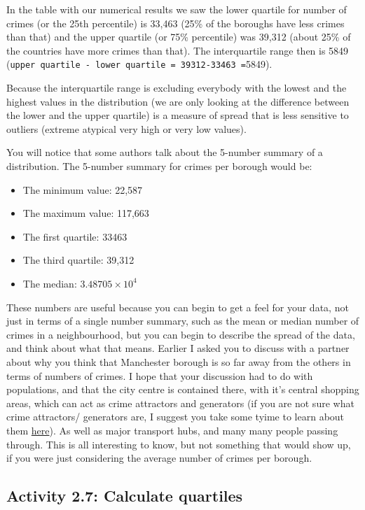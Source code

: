 \documentclass[
]{book}
\providecommand{\tightlist}{%
  \setlength{\itemsep}{0pt}\setlength{\parskip}{0pt}}
\begin{document}
In the table with our numerical results we saw the lower quartile for number of crimes (or the 25th percentile) is 33,463 (25\% of the boroughs have less crimes than that) and the upper quartile (or 75\% percentile) was 39,312 (about 25\% of the countries have more crimes than that). The interquartile range then is 5849 (\texttt{upper\ quartile\ -\ lower\ quartile\ =\ 39312-33463\ =}5849).

Because the interquartile range is excluding everybody with the lowest and the highest values in the distribution (we are only looking at the difference between the lower and the upper quartile) is a measure of spread that is less sensitive to outliers (extreme atypical very high or very low values).

You will notice that some authors talk about the 5-number summary of a distribution. The 5-number summary for crimes per borough would be:

\begin{itemize}
\tightlist
\item
  The minimum value: 22,587
\item
  The maximum value: 117,663
\item
  The first quartile: 33463
\item
  The third quartile: 39,312
\item
  The median: \ensuremath{3.48705\times 10^{4}}
\end{itemize}

These numbers are useful because you can begin to get a feel for your data, not just in terms of a single number summary, such as the mean or median number of crimes in a neighbourhood, but you can begin to describe the spread of the data, and think about what that means. Earlier I asked you to discuss with a partner about why you think that Manchester borough is so far away from the others in terms of numbers of crimes. I hope that your discussion had to do with populations, and that the city centre is contained there, with it's central shopping areas, which can act as crime attractors and generators (if you are not sure what crime attractors/ generators are, I suggest you take some tyime to learn about them \href{https://www.ncjrs.gov/App/Publications/abstract.aspx?ID=158108}{here}). As well as major transport hubs, and many many people passing through. This is all interesting to know, but not something that would show up, if you were just considering the average number of crimes per borough.

\hypertarget{activity-2.7-calculate-quartiles}{%
\subsection{Activity 2.7: Calculate quartiles}\label{activity-2.7-calculate-quartiles}}
\end{document}
